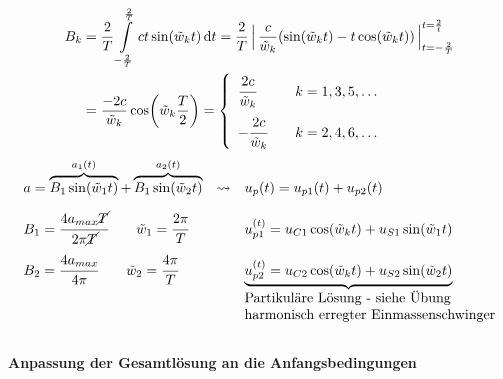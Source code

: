\documentclass[12pt]{exam}
\begin{document}
\begin{questions}
\begin{solution}
    \begin{align*}
     B_k &= \frac{2}{T} \int\limits_{-\frac{2}{T}}^{\frac{2}{T}} ct \sin(\tilde{w}_k t) \dd{t} = \frac{2}{T}\,\Big|\, \frac{c}{\tilde{w}_k}(\sin(\tilde{w}_k t)-t\cos(\tilde{w}_k t))\,\Big|_{t={-\frac{2}{T}}}^{t=\frac{2}{t}} \\
     &= \frac{-2c}{\tilde{w}_k} \cos(\tilde{w}_k\frac{T}{2}) =
     \left\{
     \begin{array}{lll}
     \cfrac{2c}{\tilde{w}_k} & &k = 1,3,5,\dots\\[1em]
     -\cfrac{2c}{\tilde{w}_k} & &k = 2,4,6,\dots
     \end{array}\right.
\end{align*}
\begin{align*}
     \begin{array}{lcl}
        a = \overbrace{B_1\sin(\tilde{w}_1 t)}^{a_1(t)} + \overbrace{B_1\sin(\tilde{w}_2 t)}^{a_2(t)} & \rightsquigarrow & u_p(t) = u_{p1}(t) + u_{p2}(t) \\[1em]
        B_1 = \cfrac{4a_{max}\cancel{T}}{2\pi\cancel{T}} \qquad \tilde{w}_1 = \cfrac{2\pi}{T} && u_{p1}^{(t)} = u_{C1} \cos(\tilde{w}_k t) + u_{S1} \sin(\tilde{w}_1 t) \\[1em]
        B_2 = \cfrac{4a_{max}}{4\pi} \qquad \tilde{w}_2 = \cfrac{4\pi}{T}&& \underbrace{u_{p2}^{(t)} = u_{C2} \cos(\tilde{w}_k t) + u_{S2} \sin(\tilde{w}_2 t)} \\
        &&\text{Partikuläre Lösung - siehe Übung}\\
        &&\text{harmonisch erregter Einmassenschwinger}
        \end{array}
\end{align*}\\[2em]

 \textbf{Anpassung der Gesamtlösung an die Anfangsbedingungen}


\end{solution}
\end{questions}
\end{document}
